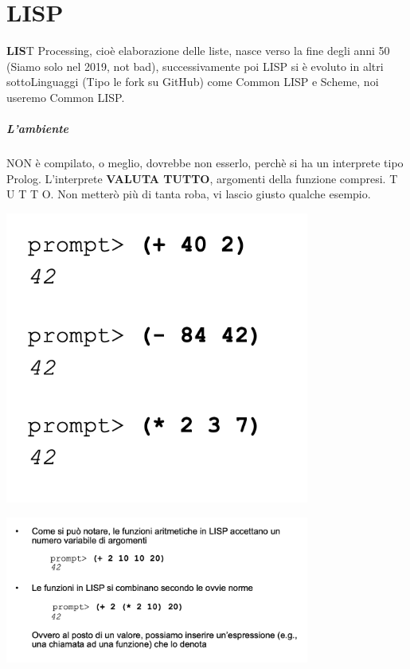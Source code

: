 \documentclass[12pt, a4paper, openany, oneside]{book}
\begin{document}
\chapter{LISP}
\textbf{LIS}T Processing, cioè elaborazione delle liste, nasce verso la fine 
degli anni 50 (Siamo solo nel 2019, not bad), successivamente poi LISP si è 
evoluto in altri sottoLinguaggi (Tipo le fork su GitHub) come Common LISP e 
Scheme, noi useremo Common LISP. 
\paragraph{L'ambiente }NON è compilato, o meglio, dovrebbe non esserlo, perchè
si ha un interprete tipo Prolog.
L'interprete \textbf{VALUTA TUTTO}, argomenti della funzione compresi. T U T T O.
Non metterò più di tanta roba, vi lascio giusto qualche esempio.
\begin{center}
\includegraphics[width=0.75\textwidth]{10}
\end{center}
\begin{center}
\includegraphics[width=0.75\textwidth]{11}
\end{center}
\end{document}
